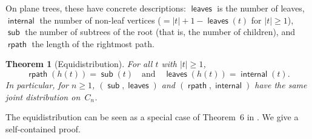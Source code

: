 \documentclass[a4paper,11pt]{article}
\newtheorem{theorem}{Theorem}[section]
\theoremstyle{definition}
\DeclareMathOperator{\rpath}{\mathsf{rpath}}
\DeclareMathOperator{\leaves}{\mathsf{leaves}}
\DeclareMathOperator{\internal}{\mathsf{internal}}
\DeclareMathOperator{\subtrees}{\mathsf{sub}}
\begin{document}
On plane trees, these have concrete descriptions:
$\leaves$ is the number of leaves,
$\internal$ the number of non-leaf vertices
($= |t| + 1 - \leaves(t)$ for $|t| \geq 1$),
$\subtrees$ the number of subtrees of the root
(that is, the number of children), and
$\rpath$ the length of the rightmost path.

\begin{theorem}[Equidistribution]\label{thm:equidistribution}
For all $t$ with $|t| \geq 1$,
\[
  \rpath(h(t)) = \subtrees(t)
  \quad\text{and}\quad
  \leaves(h(t)) = \internal(t).
\]
In particular, for $n \geq 1$, $(\subtrees, \leaves)$ and
$(\rpath, \internal)$ have the same joint distribution
on~$C_n$.
\end{theorem}

The equidistribution can be seen as a special case of Theorem~6 in
\cite{CKS13}. We give a self-contained proof.
\end{document}

